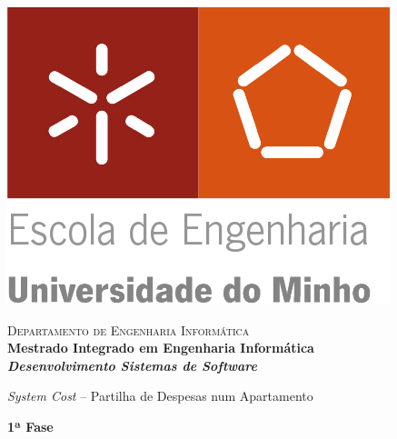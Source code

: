 \begin{titlepage}


\begin{minipage}{0.3\textwidth}
\begin{flushleft} 
\includegraphics[width=\textwidth]{logo}
\end{flushleft}
\end{minipage}
\begin{minipage}{0.6\textwidth}
\begin{flushright} 

\textsc{Departamento de Engenharia Informática}\\[0.1cm]
\bfseries Mestrado Integrado em Engenharia Informática \\ [0.1cm]
\bfseries \textit{Desenvolvimento Sistemas de Software}\\[8mm]

\end{flushright}
\end{minipage}


\vspace{3cm}


\begin{center}


\LARGE \textit{System Cost} – Partilha de Despesas num Apartamento 
\vspace{3ex}


\LARGE \textbf{1ª Fase }\\[1.5cm]





\end{center}
\end{titlepage}
